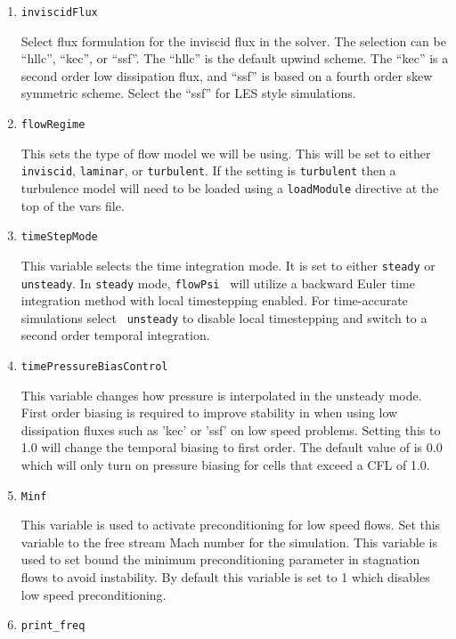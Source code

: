 \documentclass{article}
\begin{document}
\begin{enumerate}
\begin{itemize}
\end{itemize}

\item {\tt inviscidFlux}

  Select flux formulation for the inviscid flux in the solver.  The
  selection can be ``hllc'', ``kec'', or ``ssf''.  The ``hllc'' is the
  default upwind scheme.  The ``kec'' is a second order low
  dissipation flux, and ``ssf'' is based on a fourth order skew
  symmetric scheme.  Select the ``ssf'' for LES style simulations.

\item {\tt flowRegime }

This sets the type of flow model we will be using.  This will be set
to either {\tt inviscid}, {\tt laminar}, or {\tt turbulent}.  If the
setting is {\tt turbulent} then a turbulence model will need to be
loaded using a {\tt loadModule} directive at the top of the vars file.  

\item {\tt timeStepMode }

This variable selects the time integration mode.  It is set to either
{\tt steady} or {\tt unsteady}.  In {\tt steady} mode, {\tt flowPsi }
will utilize a backward Euler time integration method with local
timestepping enabled.  For time-accurate simulations select {\tt
  unsteady} to disable local timestepping and switch to a second order
temporal integration.

\item {\tt timePressureBiasControl}

This variable changes how pressure is interpolated in the unsteady
mode.  First order biasing is required to improve stability in when
using low dissipation fluxes such as 'kec' or 'ssf' on low speed
problems.  Setting this to 1.0 will change the temporal biasing to
first order.  The default value of is 0.0 which will only turn on
pressure biasing for cells that exceed a CFL of 1.0.

\item {\tt Minf}

  This variable is used to activate preconditioning for low speed
  flows.  Set this variable to the free stream Mach number for the
  simulation.  This variable is used to set bound the minimum
  preconditioning parameter in stagnation flows to avoid instability.
  By default this variable is set to 1 which disables low speed
  preconditioning.
  
\item {\tt print\_freq}


\end{enumerate}
\end{document}
